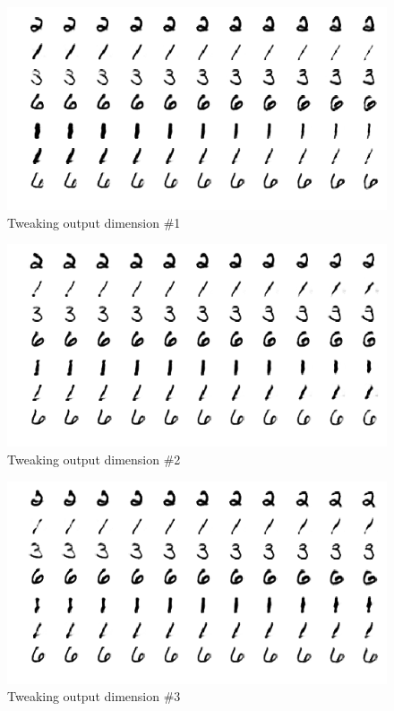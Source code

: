 \documentclass[10pt,twocolumn,letterpaper]{article}
\begin{document}
\begin{figure}[ht]
	\includegraphics[width=\columnwidth]{j1}
	\caption{Tweaking output dimension \#1}
\end{figure}
\begin{figure}[ht]
	\includegraphics[width=\columnwidth]{j2}
	\caption{Tweaking output dimension \#2}
\end{figure}
\begin{figure}[ht]
	\includegraphics[width=\columnwidth]{j3}
	\caption{Tweaking output dimension \#3}
\end{figure}
\end{document}
